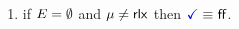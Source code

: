 \begin{definition}
\begin{enumerate}[topsep=0pt,label=(\textsc{r}\arabic*),ref=\textsc{r}\arabic*]
      
  \item \label{read-term-ca}
    if $E=\emptyset$ and $\mu\neq{\mathsf{rlx}}$ then $\aTerm \riff \FALSE$. 
  \end{enumerate}

\end{definition}
